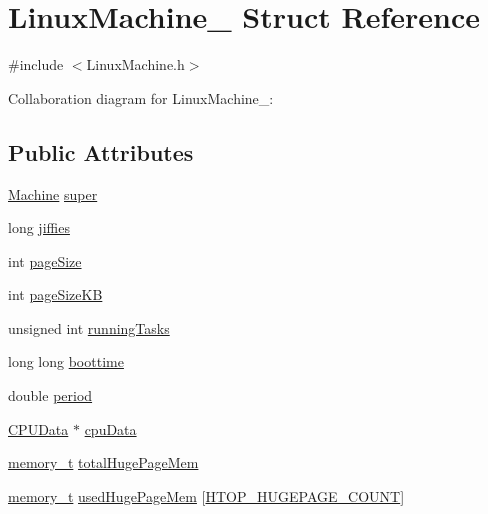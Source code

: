 \hypertarget{structLinuxMachine__}{}\section{Linux\+Machine\+\_\+ Struct Reference}
\label{structLinuxMachine__}


{\ttfamily \#include $<$Linux\+Machine.\+h$>$}



Collaboration diagram for Linux\+Machine\+\_\+\+:
\subsection*{Public Attributes}
\begin{DoxyCompactItemize}
\item 
\hyperlink{Machine_8h_aa3706f95e4706b9d02979efcabb1341d}{Machine} \hyperlink{structLinuxMachine___a207e9c5335b580c4aac4d104c9a34394}{super}
\item 
long \hyperlink{structLinuxMachine___aeceeab5b0ab194d30acb50703849d8f8}{jiffies}
\item 
int \hyperlink{structLinuxMachine___a98286198b28a30c14724483c9e7a3986}{page\+Size}
\item 
int \hyperlink{structLinuxMachine___a607ba117c8ccc406f3ed3cf35efab3b2}{page\+Size\+KB}
\item 
unsigned int \hyperlink{structLinuxMachine___af0e21f770c760aefac7f08f4d20f9612}{running\+Tasks}
\item 
long long \hyperlink{structLinuxMachine___a428a0a0f05b7ed288241c6b14d1fef9f}{boottime}
\item 
double \hyperlink{structLinuxMachine___a41063ff2e2a8eb169af1c585aa18e1f0}{period}
\item 
\hyperlink{DragonFlyBSDMachine_8h_a144f55b34d84d75d470d730435fef363}{C\+P\+U\+Data} $\ast$ \hyperlink{structLinuxMachine___acd4587e839e6f26ce683934143550a1a}{cpu\+Data}
\item 
\hyperlink{Machine_8h_ac8c2c5995f64727051f4034a810e5b07}{memory\+\_\+t} \hyperlink{structLinuxMachine___aea396412b474093bfa89ac0fd77bcf2d}{total\+Huge\+Page\+Mem}
\item 
\hyperlink{Machine_8h_ac8c2c5995f64727051f4034a810e5b07}{memory\+\_\+t} \hyperlink{structLinuxMachine___a76de51ed0c95a232274522bb46e79527}{used\+Huge\+Page\+Mem} \mbox{[}\hyperlink{LinuxMachine_8h_ad70e20dcd2e88078ca1dd2cf3f0c53f5}{H\+T\+O\+P\+\_\+\+H\+U\+G\+E\+P\+A\+G\+E\+\_\+\+C\+O\+U\+NT}\mbox{]}
\item 

\end{DoxyCompactItemize}

